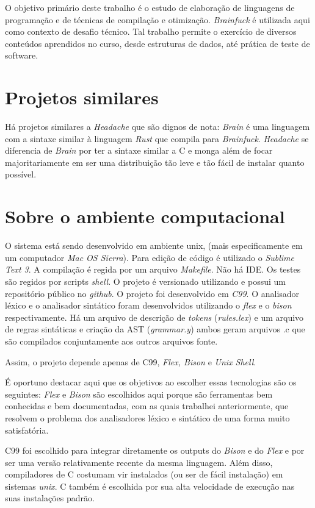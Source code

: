 O objetivo primário deste trabalho é o estudo de elaboração de linguagens de programação e de técnicas de compilação e otimização. \textit{Brainfuck} é utilizada aqui como contexto de desafio técnico. Tal trabalho permite o exercício de diversos conteúdos aprendidos no curso, desde estruturas de dados, até prática de teste de software. 	

\section{Projetos similares}
Há projetos similares a \textit{Headache} que são dignos de nota: \textit{Brain} é uma linguagem com a sintaxe similar à linguagem \textit{Rust} que compila para \textit{Brainfuck}. \textit{Headache} se diferencia de \textit{Brain} por ter a sintaxe similar a C e monga além de focar majoritariamente em ser uma distribuição tão leve e tão fácil de instalar quanto possível.

\section{Sobre o ambiente computacional}
O sistema está sendo desenvolvido em ambiente unix, (mais especificamente em um computador \textit{Mac OS Sierra}). Para edição de código é utilizado o \textit{Sublime Text 3}. A compilação é regida por um arquivo \textit{Makefile}. Não há IDE. Os testes são regidos por scripts \textit{shell}. O projeto é versionado utilizando  e possui um repositório público no \textit{github}. O projeto foi desenvolvido em \textit{C99}. O analisador léxico e o analisador sintático foram desenvolvidos utilizando o \textit{flex} e o \textit{bison} respectivamente. Há um arquivo de descrição de \textit{tokens} (\textit{rules.lex}) e um arquivo de regras sintáticas e criação da AST (\textit{grammar.y}) ambos geram arquivos .c que são compilados conjuntamente aos outros arquivos fonte.

Assim, o projeto depende apenas de C99, \textit{Flex, Bison} e \textit{Unix Shell}.

É oportuno destacar aqui que os objetivos ao escolher essas tecnologias são os seguintes: \textit{Flex} e \textit{Bison} são escolhidos aqui porque são ferramentas bem conhecidas e bem documentadas, com as quais trabalhei anteriormente, que resolvem o problema dos analisadores léxico e sintático de uma forma muito satisfatória.

C99 foi escolhido para integrar diretamente os outputs do \textit{Bison} e do \textit{Flex} e por ser uma versão relativamente recente da mesma linguagem. Além disso, compiladores de C costumam vir instalados (ou ser de fácil instalação) em sistemas \textit{unix}. C também é escolhida por sua alta velocidade de execução nas suas instalações padrão.

